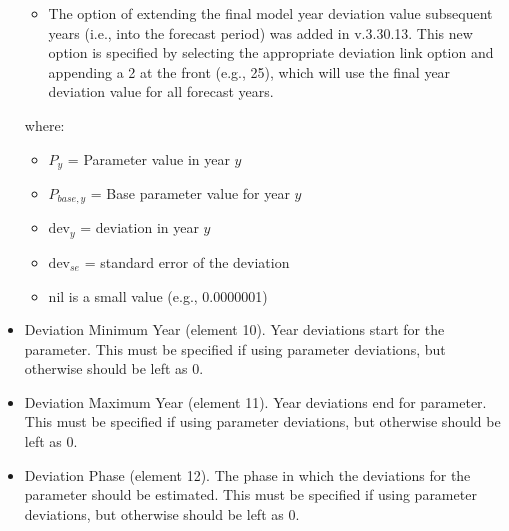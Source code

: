 \begin{itemize}
\begin{itemize}
		\item The option of extending the final model year deviation value subsequent years (i.e., into the forecast period) was added in v.3.30.13. This new option is specified by selecting the appropriate deviation link option and appending a 2 at the front (e.g., 25), which will use the final year deviation value for all forecast years.
	\end{itemize}
	where: 
	\begin{itemize}
	     \item $P_{y}$ = Parameter value in year $y$
         \item $P_{base,y}$ = Base parameter value for year $y$
		 \item $\text{dev}_y$ = deviation in year $y$
		 \item $\text{dev}_{se}$ = standard error of the deviation
		 \item nil is a small value (e.g., 0.0000001)
	\end{itemize}
\item Deviation Minimum Year (element 10). Year deviations start for the parameter. This must be specified if using parameter deviations, but otherwise should be left as 0.
	
\item Deviation  Maximum Year (element 11). Year deviations end for parameter. This must be specified if using parameter deviations, but otherwise should be left as 0.
	
\item Deviation Phase (element 12). The phase in which the deviations for the parameter should be estimated. This must be specified if using parameter deviations, but otherwise should be left as 0.
	

\end{itemize}
